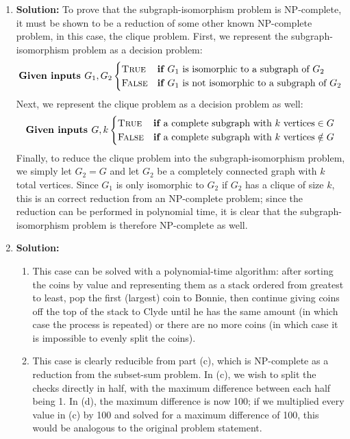 \documentclass{article}
\begin{document}
\begin{enumerate}
    \item \textbf{Solution:} 
    To prove that the subgraph-isomorphism problem is NP-complete, it must be shown to be a reduction of some other known NP-complete problem, in this case, the clique problem. First, we represent the subgraph-isomorphism problem as a decision problem:
    \begin{equation*}
        \textbf{Given inputs } G_{1}, G_{2}
        \begin{cases}
            \textsc{True} & \textbf{if } G_{1} \text{ is isomorphic to a subgraph of } G_{2}\\
            \textsc{False} & \textbf{if } G_{1 } \text{ is not isomorphic to a subgraph of } G_{2}
        \end{cases}
    \end{equation*}
    Next, we represent the clique problem as a decision problem as well:
    \begin{equation*}
        \textbf{Given inputs } G, k 
        \begin{cases}
            \textsc{True} & \textbf{if } \text{a complete subgraph with } k \text{ vertices} \in G\\
            \textsc{False} & \textbf{if } \text{a complete subgraph with } k \text{ vertices} \notin G\\
        \end{cases}
    \end{equation*}
    Finally, to reduce the clique problem into the subgraph-isomorphism problem, we simply let $G_{2}=G$ and let $G_{2}$ be a completely connected graph with $k$ total vertices. Since $G_{1}$ is only isomorphic to $G_{2}$ if $G_{2}$ has a clique of size $k$, this is an correct reduction from an NP-complete problem; since the reduction can be performed in polynomial time, it is clear that the subgraph-isomorphism problem is therefore NP-complete as well.

    \item \textbf{Solution:} 
    \begin{enumerate}
        \item This case can be solved with a polynomial-time algorithm: after sorting the coins by value and representing them as a stack ordered from greatest to least, pop the first (largest) coin to Bonnie, then continue giving coins off the top of the stack to Clyde until he has the same amount (in which case the process is repeated) or there are no more coins (in which case it is impossible to evenly split the coins).
        \item This case is clearly reducible from part (c), which is NP-complete as a reduction from the subset-sum problem. In (c), we wish to split the checks directly in half, with the maximum difference between each half being 1. In (d), the maximum difference is now 100; if we multiplied every value in (c) by 100 and solved for a maximum difference of 100, this would be analogous to the original problem statement.
    \end{enumerate}
\end{enumerate}
\end{document}
